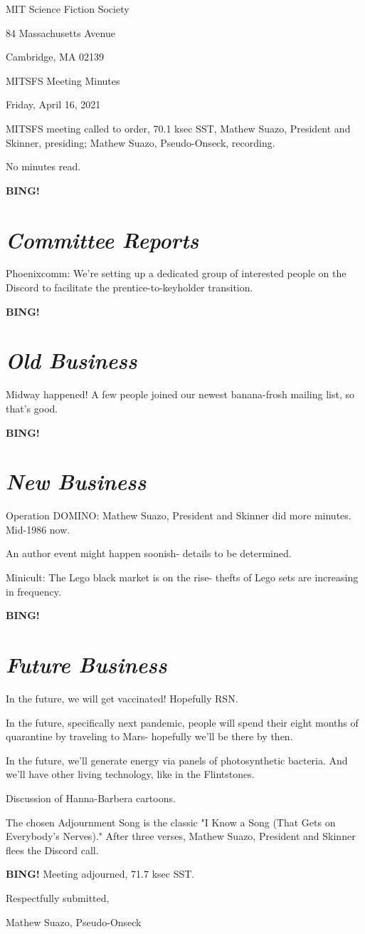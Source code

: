 \documentclass[10pt]{article}
\newcommand{\bing}{{\bf BING!} }
\newcommand{\goto}[1]{\bing \vskip 12pt \section*{{\em{#1}}}}
\newcommand{\skinner}{Mathew Suazo, President and Skinner\xspace}
\newcommand{\onseck}{Mathew Suazo, Pseudo-Onseck\xspace}
\newcommand{\meetingdate}{Friday, April 16, 2021}
\begin{document}
\begin{center}

MIT Science Fiction Society

84 Massachusetts Avenue

Cambridge, MA 02139

\vspace{12pt}

MITSFS Meeting Minutes

\meetingdate

\end{center}

\vspace{18pt}

\setlength{\parskip}{6pt}

\noindent
MITSFS meeting called to order, 70.1 ksec SST,
\skinner, presiding; \onseck, recording.

No minutes read.

\goto{Committee Reports}

Phoenixcomm: We're setting up a dedicated group of interested people on the Discord to facilitate the prentice-to-keyholder transition.

\goto{Old Business}

Midway happened! A few people joined our newest banana-frosh mailing list, so that's good.

\goto{New Business}

Operation DOMINO: \skinner did more minutes. Mid-1986 now.

An author event might happen soonish- details to be determined.

Minicult: The Lego black market is on the rise- thefts of Lego sets are increasing in frequency.

\goto{Future Business}

In the future, we will get vaccinated! Hopefully RSN.

In the future, specifically next pandemic, people will spend their eight months of quarantine by traveling to Mars- hopefully we'll be there by then.

In the future, we'll generate energy via panels of photosynthetic bacteria. And we'll have other living technology, like in the Flintstones.

Discussion of Hanna-Barbera cartoons.

The chosen Adjournment Song is the classic "I Know a Song (That Gets on Everybody's Nerves)." After three verses, \skinner flees the Discord call.

\bing
\noindent
Meeting adjourned, 71.7 ksec SST.

\vspace{18pt}

\centerline{Respectfully submitted,}
\centerline{\onseck}
\end{document}
